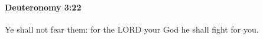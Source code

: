 
		\paragraph{Deuteronomy 3:22} %
			\label{DEUTERONOMY-3-22}

			Ye shall not fear them: for the LORD your God he shall fight for you.


